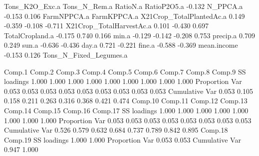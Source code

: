 \documentclass{report}
\begin{document}
\begin{Schunk}
\begin{Soutput}
Tons_K2O_Exc.a                                                  
Tons_N_Rem.a                                                    
RatioN.a                                                        
RatioP2O5.a              -0.132                                 
N_PPCA.a                 -0.153   0.106                         
FarmNPPCA.a                                                     
FarmKPPCA.a                                                     
X21Crop_TotalPlantedAc.a  0.149          -0.359  -0.108  -0.711 
X21Crop_TotalHarvestAc.a  0.101          -0.430           0.697 
TotalCropland.a          -0.175           0.740   0.166         
min.a                    -0.129  -0.142  -0.208   0.753         
precip.a                  0.709           0.249                 
sun.a                            -0.636          -0.436         
day.a                             0.721          -0.221         
fine.a                   -0.588                  -0.369         
mean.income                      -0.153   0.126                 
Tons_N_Fixed_Legumes.a                                          

               Comp.1 Comp.2 Comp.3 Comp.4 Comp.5 Comp.6 Comp.7 Comp.8 Comp.9
SS loadings     1.000  1.000  1.000  1.000  1.000  1.000  1.000  1.000  1.000
Proportion Var  0.053  0.053  0.053  0.053  0.053  0.053  0.053  0.053  0.053
Cumulative Var  0.053  0.105  0.158  0.211  0.263  0.316  0.368  0.421  0.474
               Comp.10 Comp.11 Comp.12 Comp.13 Comp.14 Comp.15 Comp.16 Comp.17
SS loadings      1.000   1.000   1.000   1.000   1.000   1.000   1.000   1.000
Proportion Var   0.053   0.053   0.053   0.053   0.053   0.053   0.053   0.053
Cumulative Var   0.526   0.579   0.632   0.684   0.737   0.789   0.842   0.895
               Comp.18 Comp.19
SS loadings      1.000   1.000
Proportion Var   0.053   0.053
Cumulative Var   0.947   1.000
\end{Soutput}
\end{Schunk}
\end{document}
